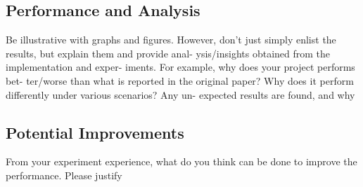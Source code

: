 \documentclass{acm_proc_article-sp}
\begin{document}
\subsection{Performance and Analysis}
Be illustrative with graphs and figures.  However, don’t just
simply enlist the results, but explain them and provide anal-
ysis/insights obtained from the implementation and exper-
iments.  For example, why does your project performs bet-
ter/worse than what is reported in the original paper?  Why
does it perform differently under various scenarios?  Any un-
expected results are found, and why

\subsection{Potential Improvements}
From  your  experiment  experience,  what  do  you  think  can
be done to improve the performance.  Please justify

%

%
%
\end{document}
